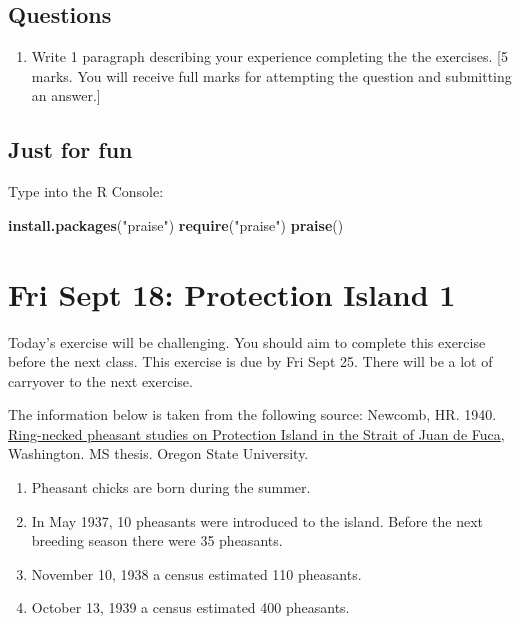 \documentclass[]{book}
\newenvironment{Shaded}{\begin{snugshade}}{\end{snugshade}}
\newcommand{\KeywordTok}[1]{\textcolor[rgb]{0.13,0.29,0.53}{\textbf{{#1}}}}
\newcommand{\StringTok}[1]{\textcolor[rgb]{0.31,0.60,0.02}{{#1}}}
\newcommand{\NormalTok}[1]{{#1}}
\providecommand{\tightlist}{%
  \setlength{\itemsep}{0pt}\setlength{\parskip}{0pt}}
\begin{document}
\section{Questions}\label{questions-2}

\begin{enumerate}
\def\labelenumi{\arabic{enumi}.}
\tightlist
\item
  Write 1 paragraph describing your experience completing the the
  exercises. {[}5 marks. You will receive full marks for attempting the
  question and submitting an answer.{]}
\end{enumerate}

\section{Just for fun}\label{just-for-fun}

Type into the R Console:

\begin{Shaded}
\begin{Highlighting}[]
\KeywordTok{install.packages}\NormalTok{(}\StringTok{"praise"}\NormalTok{)}
\KeywordTok{require}\NormalTok{(}\StringTok{"praise"}\NormalTok{)}
\KeywordTok{praise}\NormalTok{()}
\end{Highlighting}
\end{Shaded}

\chapter{Fri Sept 18: Protection Island 1}\label{PE1}

Today's exercise will be challenging. You should aim to complete this
exercise before the next class. This exercise is due by Fri Sept 25.
There will be a lot of carryover to the next exercise.

The information below is taken from the following source: Newcomb, HR.
1940.
\href{https://ir.library.oregonstate.edu/concern/graduate_thesis_or_dissertations/js956j801?locale=en}{Ring-necked
pheasant studies on Protection Island in the Strait of Juan de Fuca},
Washington. MS thesis. Oregon State University.

\begin{enumerate}
\def\labelenumi{\alph{enumi}.}
\tightlist
\item
  Pheasant chicks are born during the summer.
\item
  In May 1937, 10 pheasants were introduced to the island. Before the
  next breeding season there were 35 pheasants.
\item
  November 10, 1938 a census estimated 110 pheasants.
\item
  October 13, 1939 a census estimated 400 pheasants.
\end{enumerate}
\end{document}
